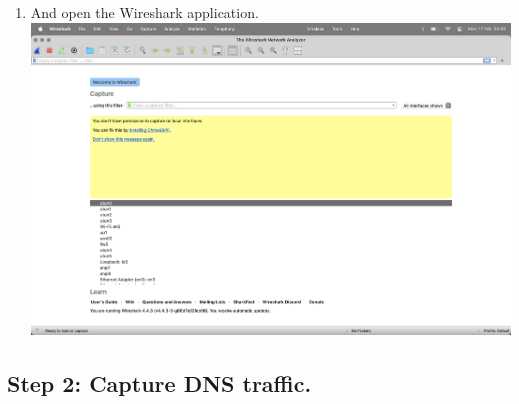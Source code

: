 \documentclass[12pt]{article}
\begin{document}
\begin{enumerate}
    \item And open the Wireshark application. \\
    \includegraphics[width=.7\textwidth]{Image4.png} \\
\end{enumerate}

\subsection{Step 2: Capture DNS traffic.}
\end{document}
